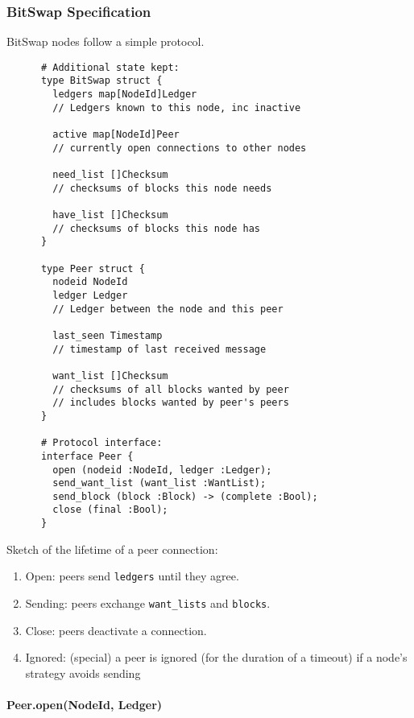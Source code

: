 \documentclass{sig-alternate}
\begin{document}
\subsubsection{BitSwap Specification}

BitSwap nodes follow a simple protocol.

\begin{verbatim}
      # Additional state kept:
      type BitSwap struct {
        ledgers map[NodeId]Ledger
        // Ledgers known to this node, inc inactive

        active map[NodeId]Peer
        // currently open connections to other nodes

        need_list []Checksum
        // checksums of blocks this node needs

        have_list []Checksum
        // checksums of blocks this node has
      }

      type Peer struct {
        nodeid NodeId
        ledger Ledger
        // Ledger between the node and this peer

        last_seen Timestamp
        // timestamp of last received message

        want_list []Checksum
        // checksums of all blocks wanted by peer
        // includes blocks wanted by peer's peers
      }

      # Protocol interface:
      interface Peer {
        open (nodeid :NodeId, ledger :Ledger);
        send_want_list (want_list :WantList);
        send_block (block :Block) -> (complete :Bool);
        close (final :Bool);
      }
\end{verbatim}


Sketch of the lifetime of a peer connection:
\begin{enumerate}
  \item Open: peers send \texttt{ledgers} until they agree.
  \item Sending: peers exchange \texttt{want\_lists} and \texttt{blocks}.
  \item Close: peers deactivate a connection.
  \item Ignored: (special) a peer is ignored (for the duration of a timeout)
        if a node's strategy avoids sending

\end{enumerate}

\paragraph{Peer.open(NodeId, Ledger)}
\end{document}
